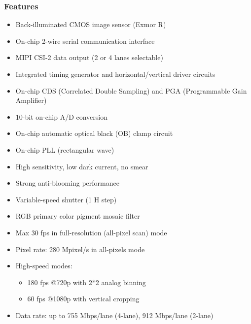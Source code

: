 \documentclass[10pt]{article}
\begin{document}
\begin{multicols}{2}
\subsubsection{Features}
\begin{itemize}
    \item Back-illuminated CMOS image sensor (Exmor R\texttrademark)
    \item On-chip 2-wire serial communication interface
    \item MIPI CSI-2 data output (2 or 4 lanes selectable)
    \item Integrated timing generator and horizontal/vertical driver circuits
    \item On-chip CDS (Correlated Double Sampling) and PGA (Programmable Gain Amplifier)
    \item 10-bit on-chip A/D conversion
    \item On-chip automatic optical black (OB) clamp circuit
    \item On-chip PLL (rectangular wave)
    \item High sensitivity, low dark current, no smear
    \item Strong anti-blooming performance
    \item Variable-speed shutter (1 H step)
    \item RGB primary color pigment mosaic filter
    \item Max 30 fps in full-resolution (all-pixel scan) mode
    \item Pixel rate: 280 Mpixel/s in all-pixels mode
    \item High-speed modes: 
        \begin{itemize}
        \item 180 fps @720p with 2*2 analog binning
        \item 60 fps @1080p with vertical cropping
        \end{itemize}
    \item Data rate: up to 755 Mbps/lane (4-lane), 912 Mbps/lane (2-lane)
\end{itemize}


\end{multicols}
\end{document}

